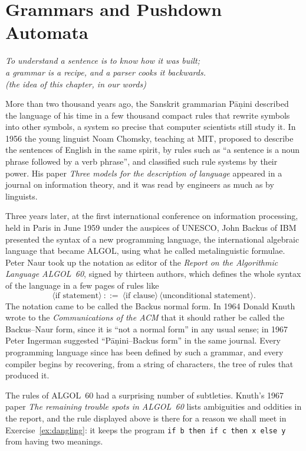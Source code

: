 \chapter{Grammars and Pushdown Automata}\label{ch:grammars}

\begin{center}\itshape
To understand a sentence is to know how it was built;\\
a grammar is a recipe, and a parser cooks it backwards.\\
\upshape(the idea of this chapter, in our words)
\end{center}

More than two thousand years ago, the Sanskrit grammarian Pāṇini described the language of his time in a few thousand compact rules that rewrite symbols into other symbols, a system so precise that computer scientists still study it. In 1956 the young linguist Noam Chomsky, teaching at MIT, proposed to describe the sentences of English in the same spirit, by rules such as ``a sentence is a noun phrase followed by a verb phrase'', and classified such rule systems by their power. His paper \emph{Three models for the description of language} appeared in a journal on information theory, and it was read by engineers as much as by linguists.

Three years later, at the first international conference on information processing, held in Paris in June 1959 under the auspices of UNESCO, John Backus of IBM presented the syntax of a new programming language, the international algebraic language that became ALGOL, using what he called metalinguistic formulae. Peter Naur took up the notation as editor of the \emph{Report on the Algorithmic Language ALGOL~60}, signed by thirteen authors, which defines the whole syntax of the language in a few pages of rules like
\[
\langle\text{if statement}\rangle\ ::=\ \langle\text{if clause}\rangle\,\langle\text{unconditional statement}\rangle.
\]
The notation came to be called the Backus normal form. In 1964 Donald Knuth wrote to the \emph{Communications of the ACM} that it should rather be called the Backus--Naur form, since it is ``not a normal form'' in any usual sense; in 1967 Peter Ingerman suggested ``Pāṇini--Backus form'' in the same journal. Every programming language since has been defined by such a grammar, and every compiler begins by recovering, from a string of characters, the tree of rules that produced it.

The rules of ALGOL~60 had a surprising number of subtleties. Knuth's 1967 paper \emph{The remaining trouble spots in ALGOL~60} lists ambiguities and oddities in the report, and the rule displayed above is there for a reason we shall meet in Exercise~\ref{ex:dangling}: it keeps the program \texttt{if b then if c then x else y} from having two meanings.

